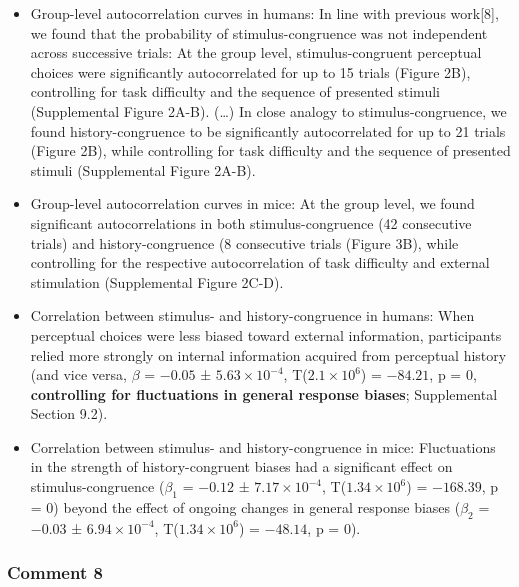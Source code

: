 \documentclass[
]{article}
\begin{document}
\begin{itemize}
\item
  Group-level autocorrelation curves in humans: In line with previous
  work{[}8{]}, we found that the probability of stimulus-congruence was
  not independent across successive trials: At the group level,
  stimulus-congruent perceptual choices were significantly
  autocorrelated for up to 15 trials (Figure 2B), controlling for task
  difficulty and the sequence of presented stimuli (Supplemental Figure
  2A-B). (\ldots) In close analogy to stimulus-congruence, we found
  history-congruence to be significantly autocorrelated for up to 21
  trials (Figure 2B), while controlling for task difficulty and the
  sequence of presented stimuli (Supplemental Figure 2A-B).
\item
  Group-level autocorrelation curves in mice: At the group level, we
  found significant autocorrelations in both stimulus-congruence (42
  consecutive trials) and history-congruence (8 consecutive trials
  (Figure 3B), while controlling for the respective autocorrelation of
  task difficulty and external stimulation (Supplemental Figure 2C-D).
\item
  Correlation between stimulus- and history-congruence in humans: When
  perceptual choices were less biased toward external information,
  participants relied more strongly on internal information acquired
  from perceptual history (and vice versa, \(\beta\) = \(-0.05\) ±
  \(\ensuremath{5.63\times 10^{-4}}\),
  T(\(\ensuremath{2.1\times 10^{6}}\)) = \(-84.21\), p = \(0\),
  \textbf{controlling for fluctuations in general response biases};
  Supplemental Section 9.2).
\item
  Correlation between stimulus- and history-congruence in mice:
  Fluctuations in the strength of history-congruent biases had a
  significant effect on stimulus-congruence (\(\beta_1\) = \(-0.12\) ±
  \(\ensuremath{7.17\times 10^{-4}}\),
  T(\(\ensuremath{1.34\times 10^{6}}\)) = \(-168.39\), p = \(0\)) beyond
  the effect of ongoing changes in general response biases (\(\beta_2\)
  = \(-0.03\) ± \(\ensuremath{6.94\times 10^{-4}}\),
  T(\(\ensuremath{1.34\times 10^{6}}\)) = \(-48.14\), p = \(0\)).
\end{itemize}

\hypertarget{comment-8-1}{%
\subsubsection{Comment 8}\label{comment-8-1}}
\end{document}
